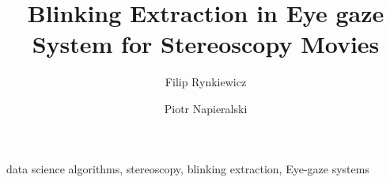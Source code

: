 \documentclass[runningheads,a4paper]{llncs}
\begin{document}
\title{Blinking Extraction in Eye gaze System for Stereoscopy Movies}

\author{Filip Rynkiewicz \and Piotr Napieralski}

%
\iffalse
\author{Firstname Lastname\inst{1} \and Firstname Lastname\inst{2} }

\institute{
Insitute 1\\
\email{...}\and
Insitute 2\\
\email{...}
}
\fi


\maketitle
\iffalse
\begin{abstract}
Abstract goes here
\end{abstract}
\fi
\begin{keywords}
data science algorithms, stereoscopy, blinking extraction, Eye-gaze systems
\end{keywords}

\end{document}
